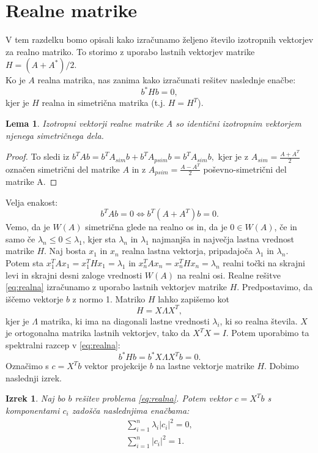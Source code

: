 \documentclass[12pt,a4paper]{amsart}
\theoremstyle{definition}
\theoremstyle{plain}
\newtheorem{lema}[definicija]{Lema}
\newtheorem{izrek}[definicija]{Izrek}
\newcommand{\abs}[1]{ \left\lvert#1\right\rvert}
\begin{document}
\section{Realne matrike}
V tem razdelku bomo opisali kako izračunamo željeno število izotropnih vektorjev za realno matriko. To storimo z uporabo lastnih vektorjev matrike $H=(A+A^\ast)/2$.\\
Ko je $A$ realna matrika, nas zanima kako izračunati rešitev naslednje enačbe:
\begin{equation}\label{eq:realna}
b^\ast Hb=0,
\end{equation}
kjer je $H$ realna in simetrična matrika (t.j. $H=H^T$).
\begin{lema} \cite{lipkin}
Izotropni vektorji realne matrike A so identični izotropnim vektorjem njenega simetričnega dela.
\end{lema} 
\begin{proof}
To sledi iz $b^T Ab=b^T A_{sim} b +b^T A_{psim} b=b^T A_{sim} b,$ kjer je z $A_{sim}=\frac{A+A^T}{2}$ označen simetrični del matrike $A$ in z $A_{psim}=\frac{A-A^T}{2}$ poševno-simetrični del matrike A.
\end{proof}
Velja enakost:
$$b^T Ab=0 \Leftrightarrow b^T (A+A^T)b=0.$$  
Vemo, da  je $W(A)$ simetrična glede na realno os in, da je $0 \in W(A)$, če in samo če $\lambda_n\le0\le\lambda_1$, kjer sta $\lambda_n$ in $\lambda_1$ najmanjša in največja lastna vrednost matrike $H$. Naj bosta $x_1$ in $x_n$ realna lastna vektorja, pripadajoča $\lambda_1$ in $\lambda_n$.  Potem sta $x_1^T Ax_1=x_1^T Hx_1=\lambda_1$ in $x_n^T Ax_n=x_n^T Hx_n=\lambda_n$ realni točki na skrajni levi in skrajni desni zaloge vrednosti $W(A)$ na realni osi.
Realne rešitve \eqref{eq:realna} izračunamo z uporabo lastnih vektorjev matrike $H$. Predpostavimo, da iščemo vektorje $b$ z normo 1. Matriko $H$ lahko zapišemo kot $$H=X\Lambda X^T,$$ kjer je $\Lambda$ matrika, ki ima na diagonali lastne vrednosti $\lambda_i$, ki so realna števila. $X$ je ortogonalna matrika lastnih vektorjev, tako da $X^T X=I$. Potem uporabimo ta spektralni razcep v \eqref{eq:realna}: $$b^\ast Hb=b^\ast X\Lambda X^T b=0.$$ Označimo s $c=X^Tb$ vektor projekcije $b$ na lastne vektorje matrike $H$. Dobimo naslednji izrek.
\begin{izrek} \label{izrek2}
Naj bo $b$ rešitev problema \eqref{eq:realna}. Potem vektor $c=X^T b$ s komponentami $c_i$ zadošča naslednjima enačbama:
\begin{align}
\sum_{i=1}^{n} \lambda_i \abs{c_i}^2=0 \label{eq:en1},\\
\sum_{i=1}^{n}\abs{c_i}^2=1. \label{eq:en2}
\end{align}
\end{izrek}
\end{document}
